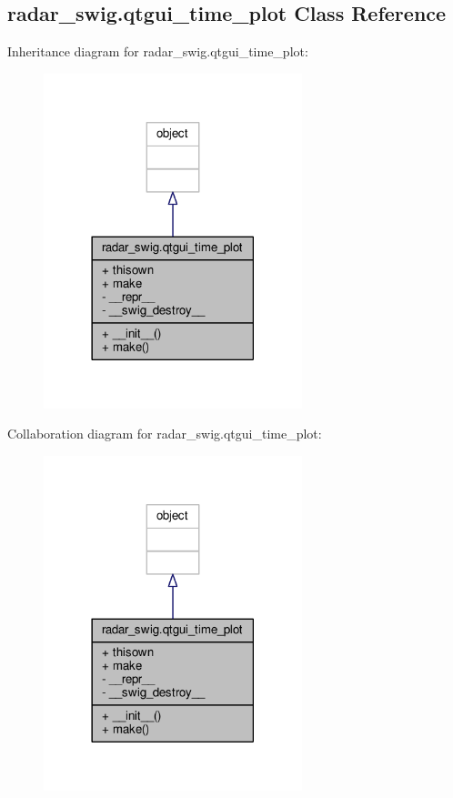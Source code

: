 \subsection{radar\+\_\+swig.\+qtgui\+\_\+time\+\_\+plot Class Reference}
\label{classradar__swig_1_1qtgui__time__plot}


Inheritance diagram for radar\+\_\+swig.\+qtgui\+\_\+time\+\_\+plot\+:
\nopagebreak
\begin{figure}[H]
\begin{center}
\leavevmode
\includegraphics[width=213pt]{d3/d25/classradar__swig_1_1qtgui__time__plot__inherit__graph}
\end{center}
\end{figure}


Collaboration diagram for radar\+\_\+swig.\+qtgui\+\_\+time\+\_\+plot\+:
\nopagebreak
\begin{figure}[H]
\begin{center}
\leavevmode
\includegraphics[width=213pt]{d3/d63/classradar__swig_1_1qtgui__time__plot__coll__graph}
\end{center}
\end{figure}
